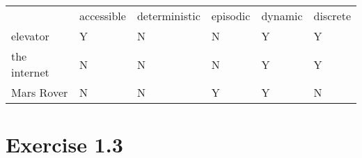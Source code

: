 \documentclass[a4paper,11pt]{scrartcl}
\begin{document}
\begin{table}[h!]
	\begin{tabular}{llllll}
		& accessible & deterministic & episodic & dynamic & discrete \\
		elevator     & Y          & N             & N        & Y       & Y        \\
		the internet & N          & N             & N        & Y       & Y        \\
		Mars Rover   & N          & N             & Y        & Y       & N       
	\end{tabular}
\end{table}


\section*{Exercise 1.3}


	
	

	
	
\end{document}
